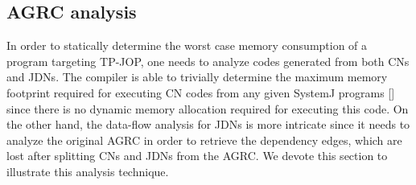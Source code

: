 
\subsection{AGRC analysis}
\label{sec:agrc-analysis}

In order to statically determine the worst case memory consumption of a
program targeting TP-JOP, one needs to analyze codes generated from both
CNs and JDNs. The compiler is able to trivially determine the maximum
memory footprint required for executing CN codes from any given SystemJ
programs [] since there is no dynamic memory allocation required for
executing this code. On the other hand, the data-flow analysis for JDNs
is more intricate since it needs to analyze the original AGRC in order
to retrieve the dependency edges, which are lost after splitting CNs and
JDNs from the AGRC. We devote this section to illustrate this analysis
technique.



